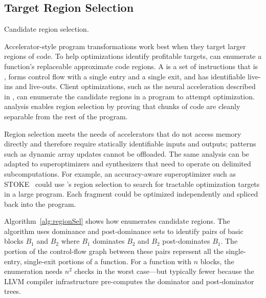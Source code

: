 \subsection{Target Region Selection}
\label{subsec:regions}

\begin{algorithm}[tb]
  \DontPrintSemicolon

   {
     {
    }
  }
\caption{Candidate region selection.}
\label{alg:regionSel}
\end{algorithm}

Accelerator-style program transformations work best when they target larger
regions of code.
To help optimizations identify profitable targets,
\sysname can enumerate a
function's replaceable approximate code regions.
%
A  is a set of instructions that is \precisepure, forms
control flow with a single entry and a single exit, and has identifiable live-ins
and live-outs.
%
Client optimizations, such as the neural acceleration described in
, can enumerate the candidate regions in a program to attempt
optimization.  \Precisepurity analysis enables region selection by proving
that chunks of code are cleanly separable from the rest of the program.

Region selection meets the needs of accelerators that do not access memory
directly and therefore require statically identifiable inputs and outputs;
patterns such as dynamic array updates cannot be offloaded.  The same analysis
can be adapted to superoptimizers and synthesizers that need to operate on
delimited subcomputations.
%
For example, an accuracy-aware superoptimizer such as
STOKE~\cite{stoke-fp} could use \sysname's region selection to search for
tractable optimization targets in a large program.
Each fragment could be optimized independently
and spliced back into the program.

Algorithm~\ref{alg:regionSel} shows how \sysname enumerates candidate regions.
The algorithm uses dominance and post-dominance sets to
identify pairs of basic blocks $B_1$ and $B_2$
where $B_1$ dominates $B_2$ and $B_2$ post-dominates $B_1$.
The portion of the control-flow graph between these pairs represent all the
single-entry, single-exit portions of a function.
For a function with $n$ blocks, the enumeration needs $n^2$ \precisepurity
checks in the worst case---but typically fewer because the LLVM compiler
infrastructure pre-computes the dominator and post-dominator trees.


